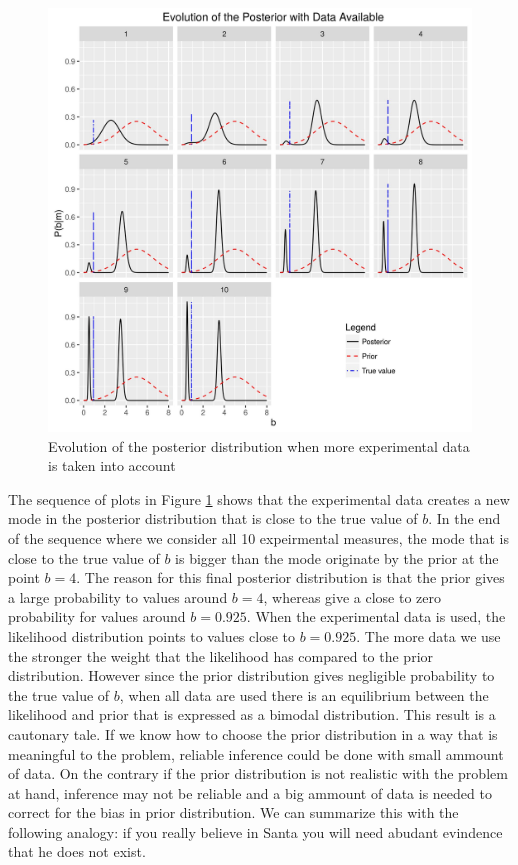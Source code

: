 \documentclass[12pt]{book}
\begin{document}
\begin{figure}[H]
\centering
\includegraphics[scale=0.7]{./FigChap3/posterior_evolution}
\caption{Evolution of the posterior distribution when more experimental data is taken into account}
\label{figpostevolution}
\end{figure}

The sequence of plots in Figure \ref{figpostevolution} shows that the experimental data creates a new mode
in the posterior distribution that is close to the true value of $b$. In the end of the sequence where we consider
all 10 expeirmental measures, the mode that is close to the true value of $b$ is bigger than the mode originate
by the prior at the point $b=4$. The reason for this final posterior distribution is that the prior gives a large
probability to values around $b=4$, whereas give a close to zero probability for values around $b=0.925$.
When the experimental data is used, the likelihood distribution points to values close to $b=0.925$. The more data
we use the stronger the weight that the likelihood has compared to the prior distribution. However since
the prior distribution gives negligible probability to the true value of $b$, when all data are used there
is an equilibrium between the likelihood and prior that is expressed as a bimodal distribution. This result
is a cautonary tale. If we know how to choose the prior distribution in a way that is meaningful to the
problem, reliable inference could be done with small ammount of data. On the contrary if the prior distribution
is not realistic with the problem at hand, inference may not be reliable and a big ammount of data is needed
to correct for the bias in prior distribution. We can summarize this with the following analogy: if you really believe
in Santa you will need abudant evindence that he does not exist.







\end{document}
